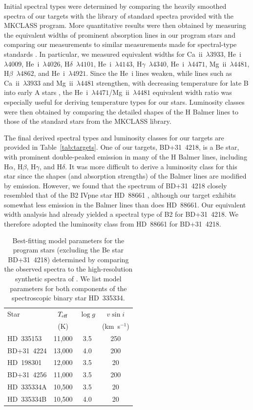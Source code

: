 \documentclass[fleqn,usenatbib]{mnras}
\begin{document}
Initial spectral types were determined by comparing the heavily smoothed spectra of our targets with the library of standard spectra provided with the MKCLASS program. More quantitative results were then obtained by measuring the equivalent widths of prominent absorption lines in our program stars and comparing our measurements to similar measurements made for spectral-type standards \citep{m13}. In particular, we measured equivalent widths for Ca~{\sc ii}~$\lambda3933$, He~{\sc i}~$\lambda4009$, He~{\sc i}~$\lambda4026$, H$\delta$~$\lambda4101$, He~{\sc i}~$\lambda4143$, H$\gamma$~$\lambda4340$, He~{\sc i}~$\lambda4471$, Mg~{\sc ii}~$\lambda4481$, H$\beta$~$\lambda4862$, and He~{\sc i}~$\lambda4921$. Since the He~{\sc i} lines weaken, while lines such as Ca~{\sc ii}~$\lambda3933$ and Mg~{\sc ii}~$\lambda4481$ strengthen, with decreasing temperature for late B into early A stars \citep{gc09}, the He~{\sc i}~$\lambda4471$/Mg~{\sc ii}~$\lambda4481$ equivalent width ratio was especially useful for deriving temperature types for our stars. Luminosity classes were then obtained by comparing the detailed shapes of the H Balmer lines to those of the standard stars from the MKCLASS library.

The final derived spectral types and luminosity classes for our targets are provided in Table~\ref{tab:targets}. One of our targets, BD+31~4218, is a Be star, with prominent double-peaked emission in many of the H Balmer lines, including H$\alpha$, H$\beta$, H$\gamma$, and H$\delta$. It was more difficult to derive a luminosity class for this star since the shapes (and absorption strengths) of the Balmer lines are modified by emission. However, we found that the spectrum of BD+31~4218 closely resembled that of the B2 IVpne star HD~88661 \citep[see Figure~4.17 in][]{gc09}, although our target exhibits somewhat less emission in the Balmer lines than does HD~88661. Our equivalent width analysis had already yielded a spectral type of B2 for BD+31~4218. We therefore adopted the luminosity class from HD~88661 for BD+31~4218.

\begin{table}
\centering
\caption{Best-fitting model parameters for the program stars (excluding the Be star BD+31~4218) determined by comparing the observed spectra to the high-resolution synthetic spectra of \citet{m05}. We list model parameters for both components of the spectroscopic binary star HD~335334.}
\label{tab:models}
\begin{tabular}{lccc}
\hline
Star & $T_{\rm eff}$ & $\log g$ & $v \sin i$ \\
 & (K) & & (km~s$^{-1}$) \\
\hline
HD~335153 & 11,000 & 3.5 & 250 \\
BD+31~4224 & 13,000 & 4.0 & 200 \\
HD~198301 & 12,000 & 3.5 & 20 \\
BD+31~4256 & 11,000 & 3.5 & 200 \\
HD~335334A & 10,500 & 3.5 & 20 \\
HD~335334B & 10,500 & 4.0 & 20 \\
\hline
\end{tabular}
\end{table}
\end{document}
